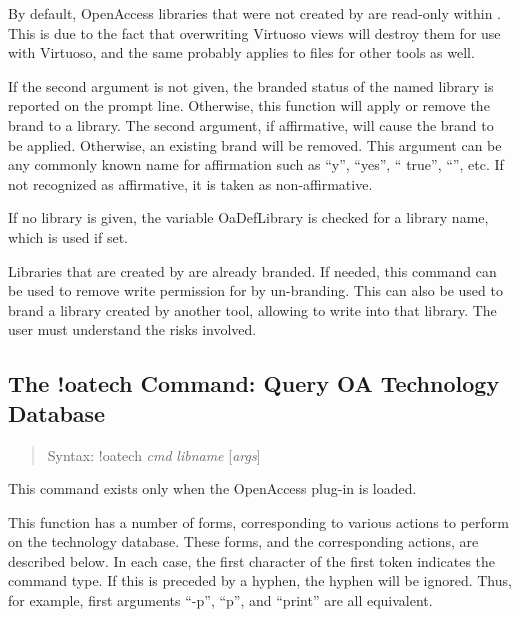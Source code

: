 By default, OpenAccess libraries that were not created by {\Xic} are
read-only within {\Xic}.  This is due to the fact that overwriting
Virtuoso views will destroy them for use with Virtuoso, and the same
probably applies to files for other tools as well.

If the second argument is not given, the branded status of the named
library is reported on the prompt line.  Otherwise, this function will
apply or remove the brand to a library.  The second argument, if
affirmative, will cause the brand to be applied.  Otherwise, an
existing brand will be removed.  This argument can be any commonly
known name for affirmation such as ``{\vt y}'', ``{\vt yes}'', ``{\vt
true}'', ``{}'', etc.  If not recognized as affirmative, it is
taken as non-affirmative.

If no library is given, the variable {\et OaDefLibrary} is checked for
a library name, which is used if set. 

Libraries that are created by {\Xic} are already branded.  If needed,
this command can be used to remove write permission for {\Xic} by
un-branding.  This can also be used to brand a library created by
another tool, allowing {\Xic} to write into that library.  The user
must understand the risks involved.

\subsection{The {\cb !oatech} Command: Query OA Technology Database}
\begin{quote}
Syntax: {\vt !oatech} {\it cmd} {\it libname} [{\it args\/}]
\end{quote}
This command exists only when the OpenAccess plug-in is loaded.

This function has a number of forms, corresponding to various actions
to perform on the technology database.  These forms, and the
corresponding actions, are described below.  In each case, the first
character of the first token indicates the command type.  If this is
preceded by a hyphen, the hyphen will be ignored.  Thus, for example,
first arguments ``{\vt -p}'', ``{\vt p}'', and ``{\vt print}'' are all
equivalent.

